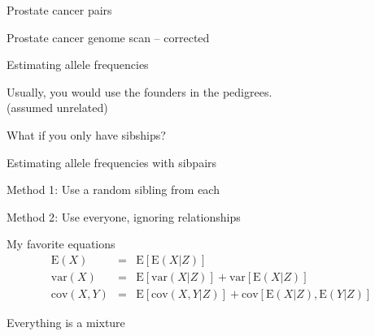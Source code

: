 \documentclass[aspectratio=169,12pt,t]{beamer}
\begin{document}
\begin{frame}[c]{Prostate cancer pairs}
\end{frame}



\begin{frame}[c]{Prostate cancer genome scan -- corrected}
\end{frame}


\begin{frame}{Estimating allele frequencies}

  \bigskip

  Usually, you would use the {\hilit founders} in the pedigrees. \\
  \qquad (assumed unrelated)

  \bigskip \bigskip

  What if you only have {\vhilit sibships}?

\end{frame}



\begin{frame}{Estimating allele frequencies with sibpairs}

  \bigskip

  {\hilit Method 1}: Use a random sibling from each



  \bigskip \bigskip \bigskip

  {\hilit Method 2}: Use everyone, ignoring relationships




\end{frame}



\begin{frame}[c]{My favorite equations}
  \begin{eqnarray*}
    \text{E}(X) & = & \text{E}[ \text{E}(X|Z) ] \\[18pt]
    \text{var}(X) & = & \text{E}[ \text{var}(X|Z) ] + \text{var}[ \text{E}(X|Z) ] \\[18pt]
    \text{cov}(X,Y) & = & \text{E}[ \text{cov}(X,Y|Z) ] + \text{cov}[ \text{E}(X|Z), \text{E}(Y|Z) ]
  \end{eqnarray*}

  \bigskip\bigskip

  \hfill {\lolit Everything is a mixture}

\end{frame}
\end{document}

